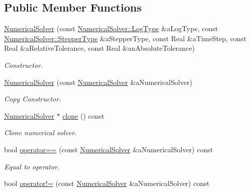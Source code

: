 \subsection*{Public Member Functions}
\begin{DoxyCompactItemize}
\item 
\hyperlink{classostk_1_1astro_1_1_numerical_solver_ac67671257ab8be4f684842505f4ce8d8}{Numerical\+Solver} (const \hyperlink{classostk_1_1astro_1_1_numerical_solver_a23e9e3f7d630f3097b4cbd91d9a2aa4c}{Numerical\+Solver\+::\+Log\+Type} \&a\+Log\+Type, const \hyperlink{classostk_1_1astro_1_1_numerical_solver_afb80f81b2c3cc1d356b0b4749e45b947}{Numerical\+Solver\+::\+Stepper\+Type} \&a\+Stepper\+Type, const Real \&a\+Time\+Step, const Real \&a\+Relative\+Tolerance, const Real \&an\+Absolute\+Tolerance)
\begin{DoxyCompactList}\small\item\em Constructor. \end{DoxyCompactList}\item 
\hyperlink{classostk_1_1astro_1_1_numerical_solver_ab156915994e0b9207d9c240114f6ed67}{Numerical\+Solver} (const \hyperlink{classostk_1_1astro_1_1_numerical_solver}{Numerical\+Solver} \&a\+Numerical\+Solver)
\begin{DoxyCompactList}\small\item\em Copy Constructor. \end{DoxyCompactList}\item 
\hyperlink{classostk_1_1astro_1_1_numerical_solver}{Numerical\+Solver} $\ast$ \hyperlink{classostk_1_1astro_1_1_numerical_solver_a5b96baffe23b77c14046e4fb7ffc89a1}{clone} () const
\begin{DoxyCompactList}\small\item\em Clone numerical solver. \end{DoxyCompactList}\item 
bool \hyperlink{classostk_1_1astro_1_1_numerical_solver_a4ec848789b81d968cdc1d3d5003ea66a}{operator==} (const \hyperlink{classostk_1_1astro_1_1_numerical_solver}{Numerical\+Solver} \&a\+Numerical\+Solver) const
\begin{DoxyCompactList}\small\item\em Equal to operator. \end{DoxyCompactList}\item 
bool \hyperlink{classostk_1_1astro_1_1_numerical_solver_af488ebaa295739474e0f696aa9134171}{operator!=} (const \hyperlink{classostk_1_1astro_1_1_numerical_solver}{Numerical\+Solver} \&a\+Numerical\+Solver) const

\end{DoxyCompactItemize}
